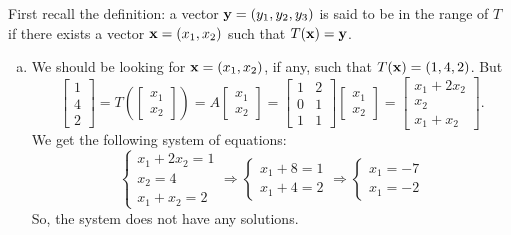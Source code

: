\vspace{2mm}
First recall the definition: a vector ${\bf y}=(y_1,y_2,y_3)$ is said to be in the range of $T$ if there exists a vector ${\bf x}=(x_1,x_2)$ such that $T({\bf x})={\bf y}$.

\begin{enumerate}[a)]
  \item We should be looking for ${\bf x}=(x_1,x_2)$, if any, such that $T({\bf x})=(1,4,2)$. But
$$
\left[\begin{array}{c}1\\4\\2\end{array}\right] =
T\left(\left[\begin{array}{c}x_1\\x_2\end{array}\right]\right) =
A\left[\begin{array}{c}x_1\\x_2\end{array}\right] =
\left[\begin{array}{cc}1&2\\0&1\\1&1\end{array}\right]\left[\begin{array}{c}x_1\\x_2\end{array}\right]=\left[\begin{array}{c}x_1+2x_2\\x_2\\x_1+x_2\end{array}\right].
$$
We get the following system of equations:
$$
\left\{\begin{array}{c}x_1+2x_2=1\\x_2=4\\x_1+x_2=2\end{array}\right.\Rightarrow
\left\{\begin{array}{c}x_1+8=1\\x_1+4=2\end{array}\right.\Rightarrow
\left\{\begin{array}{c}x_1=-7\\x_1=-2\end{array}\right.
$$
So, the system does not have any solutions.


\end{enumerate}
